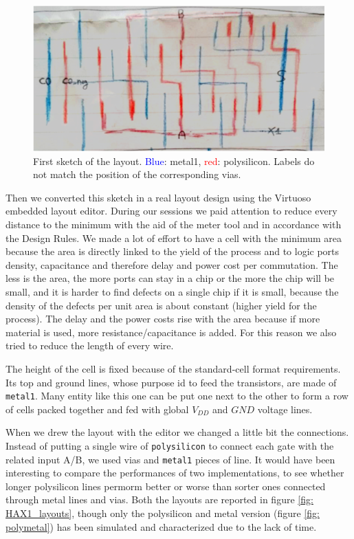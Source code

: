 \documentclass[a4paper]{article}
\begin{document}
\begin{figure}[H]
      \centering
      \includegraphics[width=0.8\linewidth]{./Images/HA/layout_drw.png}
	  \caption{First sketch of the layout. \textcolor{blue}{Blue}: metal1, \textcolor{red}{red}: polysilicon. Labels do not match the position of the corresponding vias.}
	  \label{fig: lay_drw}
\end{figure}

Then we converted this sketch in a real layout design using the Virtuoso embedded layout editor. During our sessions we paid attention to reduce every distance to the minimum with the aid of the meter tool and in accordance with the Design Rules. We made a lot of effort to have a cell with the minimum area because the area is directly linked to the yield of the process and to logic ports density, capacitance and therefore delay and power cost per commutation. The less is the area, the more ports can stay in a chip or the more the chip will be small, and it is harder to find defects on a single chip if it is small, because the density of the defects per unit area is about constant (higher yield for the process). The delay and the power costs rise with the area because if more material is used, more resistance/capacitance is added. For this reason we also tried to reduce the length of every wire.

The height of the cell is fixed because of the standard-cell format requirements. Its top and ground lines, whose purpose id to feed the transistors, are made of \texttt{metal1}. Many entity like this one can be put one next to the other to form a row of cells packed together and fed with global $V_{DD}$ and $GND$ voltage lines.

When we drew the layout with the editor we changed a little bit the connections. Instead of putting a single wire of \texttt{polysilicon} to connect each gate with the related input A/B, we used vias and \texttt{metal1} pieces of line. It would have been interesting to compare the performances of two implementations, to see whether longer polysilicon lines permorm better or worse than sorter ones connected through metal lines and vias. Both the layouts are reported in figure \ref{fig: HAX1_layouts}, though only the polysilicon and metal version (figure \ref{fig: polymetal}) has been simulated and characterized due to the lack of time.
\end{document}
